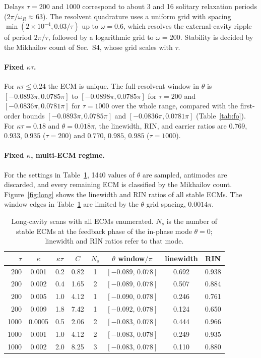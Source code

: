 \documentclass[11pt]{article}
\newif\ifmarked
\newenvironment{revised}{\ifmarked\color{blue}\fi}{}
\begin{document}
\begin{revised}
Delays $\tau=200$ and $1000$ correspond to about 3 and 16 solitary relaxation periods ($2\pi/\omega_R\approx63$). The resolvent quadrature uses a uniform grid with spacing $\min(2\times10^{-4},0.03/\tau)$ up to $\omega=0.6$, which resolves the external-cavity ripple of period $2\pi/\tau$, followed by a logarithmic grid to $\omega=200$. Stability is decided by the Mikhailov count of Sec.~S4, whose grid scales with $\tau$.

\paragraph{Fixed $\kappa\tau$.} For $\kappa\tau\le0.24$ the ECM is unique. The full-resolvent window in $\theta$ is $[-0.0893\pi,0.0785\pi]$ to $[-0.0898\pi,0.0785\pi]$ for $\tau=200$ and $[-0.0836\pi,0.0781\pi]$ for $\tau=1000$ over the whole range, compared with the first-order bounds $[-0.0893\pi,0.0785\pi]$ and $[-0.0836\pi,0.0781\pi]$ (Table~\ref{tab:fo}). For $\kappa\tau=0.18$ and $\theta=0.018\pi$, the linewidth, RIN, and carrier ratios are $0.769$, $0.933$, $0.935$ ($\tau=200$) and $0.770$, $0.985$, $0.985$ ($\tau=1000$).

\paragraph{Fixed $\kappa$, multi-ECM regime.} For the settings in Table~\ref{tab:longS}, 1440 values of $\theta$ are sampled, antimodes are discarded, and every remaining ECM is classified by the Mikhailov count. Figure~\ref{fig:long} shows the linewidth and RIN ratios of all stable ECMs. The window edges in Table~\ref{tab:longS} are limited by the $\theta$ grid spacing, $0.0014\pi$.

\begin{table}[h]
\centering
\caption{Long-cavity scans with all ECMs enumerated. $N_s$ is the number of stable ECMs at the feedback phase of the in-phase mode $\theta=0$; linewidth and RIN ratios refer to that mode.}
\label{tab:longS}
\begin{tabular}{rccccccc}
\toprule
$\tau$ & $\kappa$ & $\kappa\tau$ & $C$ & $N_s$ & $\theta$ window$/\pi$ & linewidth & RIN\\
\midrule
200 & 0.001 & 0.2 & 0.82 & 1 & $[-0.089,\,0.078]$ & 0.692 & 0.938\\
200 & 0.002 & 0.4 & 1.65 & 2 & $[-0.089,\,0.078]$ & 0.507 & 0.884\\
200 & 0.005 & 1.0 & 4.12 & 1 & $[-0.090,\,0.078]$ & 0.246 & 0.761\\
200 & 0.009 & 1.8 & 7.42 & 1 & $[-0.092,\,0.078]$ & 0.124 & 0.650\\
1000 & 0.0005 & 0.5 & 2.06 & 2 & $[-0.083,\,0.078]$ & 0.444 & 0.966\\
1000 & 0.001 & 1.0 & 4.12 & 2 & $[-0.083,\,0.078]$ & 0.249 & 0.935\\
1000 & 0.002 & 2.0 & 8.25 & 3 & $[-0.083,\,0.078]$ & 0.110 & 0.880\\
\bottomrule
\end{tabular}
\end{table}


\end{revised}
\end{document}

